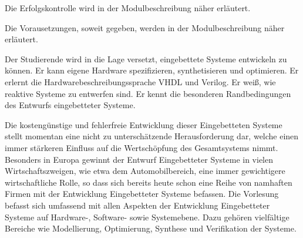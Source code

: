 \begin{course}

\setdoclanguagegerman
{}



\coursehead


\label{cour_7227.dp_997}


\begin{styleenv}
\begin{assessment}
Die Erfolgskontrolle wird in der Modulbeschreibung näher erläutert.


\end{assessment}

\begin{conditions}Die Vorausetzungen, soweit gegeben, werden in der Modulbeschreibung näher erläutert.

\end{conditions}


\end{styleenv}

\begin{learningoutcomes}
Der Studierende wird in die Lage versetzt, eingebettete Systeme entwickeln zu können. Er kann eigene Hardware spezifizieren, synthetisieren und optimieren. Er erlernt die Hardwarebeschreibungssprache VHDL und Verilog.\newline
Er weiß, wie reaktive Systeme zu entwerfen sind. Er kennt die besonderen Randbedingungen des Entwurfs eingebetteter Systeme.


\end{learningoutcomes}

\begin{content}
Die kostengünstige und fehlerfreie Entwicklung dieser Eingebetteten Systeme stellt momentan eine nicht zu unterschätzende Herausforderung dar, welche einen immer stärkeren Einfluss auf die Wertschöpfung des Gesamtsystems nimmt. Besonders in Europa gewinnt der Entwurf Eingebetteter Systeme in vielen Wirtschaftszweigen, wie etwa dem Automobilbereich, eine immer gewichtigere wirtschaftliche Rolle, so dass sich bereits heute schon eine Reihe von namhaften Firmen mit der Entwicklung Eingebetteter Systeme befassen.\newline
Die Vorlesung befasst sich umfassend mit allen Aspekten der Entwicklung Eingebetteter Systeme auf Hardware-, Software- sowie Systemebene. Dazu gehören vielfältige Bereiche wie Modellierung, Optimierung, Synthese und Verifikation der Systeme.



\end{content}
\end{course}
